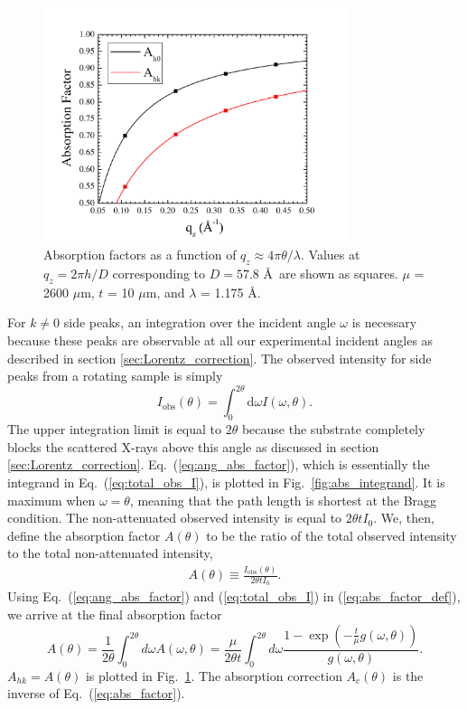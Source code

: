 \begin{figure}[htbp]
  \centering
  \includegraphics[width=0.8\textwidth]{figures/ripple/analysis/abs_factor}
  \caption{Absorption factors as a function of $q_z \approx 4\pi\theta/\lambda$.
  Values at $q_z=2\pi h/D$ corresponding to $D=57.8$ \AA\ are shown as squares.
  $\mu$ = 2600 $\mu$m, $t$ = 10 $\mu$m, and $\lambda$ = 1.175 \AA.}
  \label{fig:abs_factor}
\end{figure}

For $k\neq 0$ side peaks, an integration over the incident angle $\omega$
is necessary because these peaks are observable at all our experimental incident angles as
described in section \ref{sec:Lorentz_correction}.
The observed intensity for side peaks from a rotating sample is simply
\begin{equation}
  I_\textrm{obs}(\theta) 
  = \int_0^{2\theta}\textrm{d}\omega I(\omega,\theta).
  \label{eq:total_obs_I}
\end{equation}
The upper integration limit is equal to $2\theta$ because the substrate
completely blocks the scattered X-rays above this angle as discussed in 
section \ref{sec:Lorentz_correction}. Eq.~(\ref{eq:ang_abs_factor}),
which is essentially the integrand in Eq.~(\ref{eq:total_obs_I}), is 
plotted in Fig.~\ref{fig:abs_integrand}. It is maximum when $\omega=\theta$,
meaning that the path length is shortest at the Bragg condition.
The non-attenuated observed intensity is equal to $2\theta t I_0$. We, then, 
define the absorption factor $A(\theta)$ to be the ratio of the total 
observed intensity to the total non-attenuated intensity,
\begin{align}
  A(\theta) \equiv \frac{I_\textrm{obs}(\theta)}{2\theta tI_0}. 
  \label{eq:abs_factor_def}
\end{align}
Using Eq.~(\ref{eq:ang_abs_factor}) and (\ref{eq:total_obs_I})
in (\ref{eq:abs_factor_def}), we arrive
at the final absorption factor
\begin{equation}
  A(\theta) = \frac{1}{2\theta}\int_0^{2\theta}d\omega A(\omega,\theta)
  = \frac{\mu}{2\theta t} \int_0^{2\theta}d\omega 
  \frac{1-\exp\left(-\frac{t}{\mu}g(\omega,\theta)\right)}{g(\omega,\theta)}.
  \label{eq:abs_factor}
\end{equation}
$A_{hk} = A(\theta)$ is plotted in Fig.~\ref{fig:abs_factor}.
The absorption correction $A_c(\theta)$ is the inverse of Eq.~(\ref{eq:abs_factor}). 

